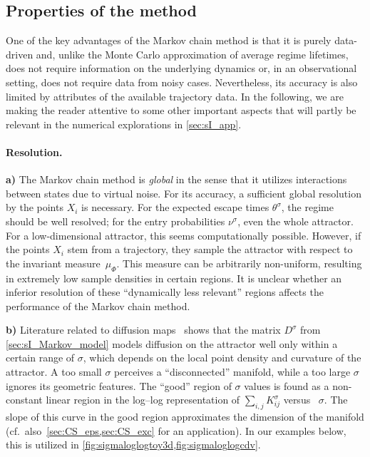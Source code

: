 \subsection{Properties of the method} \label{sec:sI_lim}
One of the key advantages of the Markov chain method is that it is purely data-driven and, unlike the Monte Carlo approximation of average regime lifetimes, does not require information on the underlying dynamics or, in an observational setting, does not require data from noisy cases.
Nevertheless, its accuracy is also limited by attributes of the available trajectory data. In the following, we are making the reader attentive to some other important aspects that will partly be relevant in the numerical explorations in \cref{sec:sI_app}.

\paragraph{Resolution.}

\textbf{a)} The Markov chain method is \emph{global} in the sense that it utilizes interactions between states due to virtual noise. For its accuracy, a sufficient global resolution by the points $X_i$ is necessary. For the expected escape times $\theta^\sigma$, the regime should be well resolved; for the entry probabilities $\nu^\sigma$, even the whole attractor. For a low-dimensional attractor, this seems computationally possible. However, if the points $X_i$ stem from a trajectory, they sample the attractor with respect to the invariant measure~$\mu_{\Phi}$. This measure can be arbitrarily non-uniform, resulting in extremely low sample densities in certain regions. It is unclear whether an inferior resolution of these \enquote{dynamically less relevant} regions affects the performance of the Markov chain method.

\textbf{b)} Literature related to diffusion maps~\parencite{coifmanDiffusionMaps2006,berryNonparametricForecastingLowdimensional2015} shows that the matrix $D^{\sigma}$ from \cref{sec:sI_Markov_model} models diffusion on the attractor well only within a certain range of $\sigma$, which depends on the local point density and curvature of the attractor. A too small $\sigma$ perceives a \enquote{disconnected} manifold, while a too large $\sigma$ ignores its geometric features. The \enquote{good} region of $\sigma$ values is found as a non-constant linear region in the log--log representation of $\sum_{i,j}K^\sigma_{ij}$ versus~ $\sigma$. The slope of this curve in the good region approximates the dimension of the manifold (cf.~also~\cref{sec:CS_eps,sec:CS_exc} for an application). In our examples below, this is utilized in \cref{fig:sigmaloglogtoy3d,fig:sigmaloglogcdv}.

